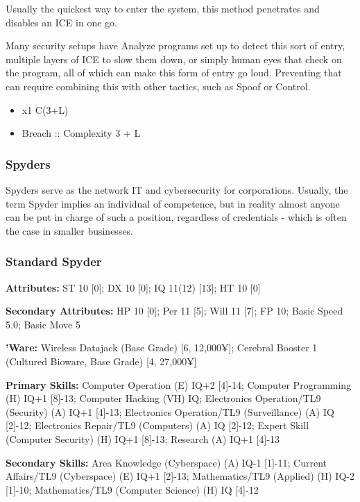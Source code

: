 \begin{multicols}{2}
	Usually the quickest way to enter the system, this method penetrates and disables an ICE in one go. 
	
	Many security setups have Analyze programs set up to detect this sort of entry, multiple layers of ICE to slow them down, or simply human eyes that check on the program, all of which can make this form of entry go loud. Preventing that can require combining this with other tactics, such as Spoof or Control.
	
	\begin{itemize}
		\itemsep 0pt
		\item x1 C(3+L)
		\item Breach :: Complexity 3 + L
	\end{itemize}
	
	
	\subsubsection{Spyders}
	
	Spyders serve as the network IT and cybersecurity for corporations. Usually, the term Spyder implies an  individual of competence, but in reality almost anyone can be put in charge of such a position, regardless of credentials - which is often the case in smaller businesses.
	
	\subsubsection*{Standard Spyder}
	
	\textbf{Attributes:}
	ST 10 [0]; DX 10 [0]; IQ 11(12) [13]; HT 10 [0]
	
	\textbf{Secondary Attributes:} HP 10 [0]; Per 11 [5]; Will 11 [7]; FP 10; Basic Speed 5.0; Basic Move 5
	
	\textbf{'Ware:} 
	Wireless Datajack (Base Grade) [6, 12,000¥]; Cerebral Booster 1 (Cultured Bioware, Base Grade) [4, 27,000¥]
	
	\textbf{Primary Skills:} 
	Computer Operation (E) IQ+2 [4]-14; Computer Programming (H) IQ+1 [8]-13; Computer Hacking (VH) IQ; Electronics Operation/TL9 (Security) (A) IQ+1 [4]-13; Electronics Operation/TL9 (Surveillance) (A) IQ [2]-12; Electronics Repair/TL9 (Computers) (A) IQ [2]-12; Expert Skill (Computer Security) (H) IQ+1 [8]-13; Research (A) IQ+1 [4]-13
	
	\textbf{Secondary Skills:} 
	Area Knowledge (Cyberspace) (A) IQ-1 [1]-11; Current Affairs/TL9 (Cyberspace) (E) IQ+1 [2]-13; Mathematics/TL9 (Applied) (H) IQ-2 [1]-10; Mathematics/TL9 (Computer Science) (H) IQ [4]-12
	

\end{multicols}
